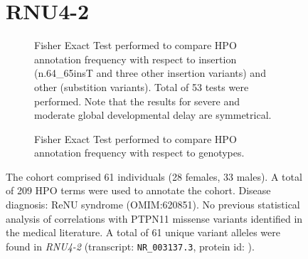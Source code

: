 \begin{figure}[htbp]
\section*{RNU4-2}
\centering
\begin{subfigure}[b]{0.95\textwidth}
\centering
{}
\captionsetup{justification=raggedright,singlelinecheck=false}
\caption{Fisher Exact Test performed to compare HPO annotation frequency with respect to insertion (n.64\_65insT and three other insertion variants) and other (substition variants). Total of
        53 tests were performed. Note that the results for severe and moderate global developmental delay are symmetrical.}
\end{subfigure}

\vspace{2em}

\begin{subfigure}[b]{0.95\textwidth}
\centering
{}
\captionsetup{justification=raggedright,singlelinecheck=false}
\caption{Fisher Exact Test performed to compare HPO annotation frequency with respect to genotypes.}
\end{subfigure}

\vspace{2em}

\caption{ The cohort comprised 61 individuals (28 females, 33 males). A total of 209 HPO terms were used to annotate the cohort. Disease diagnosis: ReNU syndrome (OMIM:620851). No previous statistical analysis of correlations with PTPN11 missense variants identified in the medical literature. A total of 61 unique variant alleles were found in \textit{RNU4-2} (transcript: \texttt{NR\_003137.3}, protein id: \texttt{}).}
\end{figure}
